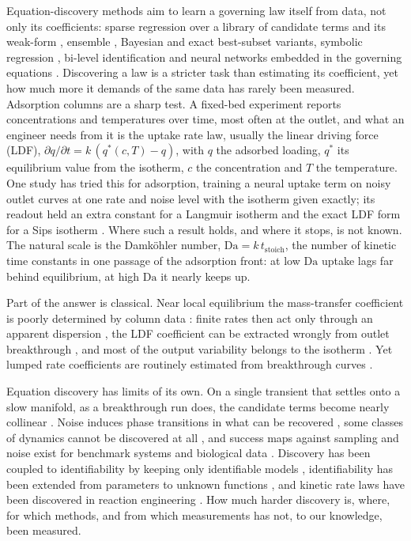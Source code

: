 \documentclass[11pt]{article}
\newcommand{\Da}{\mathrm{Da}}
\newcommand{\qs}{q^{*}}
\begin{document}
Equation-discovery methods aim to learn a governing law itself from data, not only its
coefficients: sparse regression over a library of candidate terms \citep{brunton2016,rudy2016}
and its weak-form \citep{messenger2021ode,reinbold2020}, ensemble \citep{fasel2022}, Bayesian \citep{fung2025} and exact best-subset
\citep{bertsimas2022} variants, symbolic regression
\citep{cranmer2023,udrescu2020,ruan2026,yu2026}, bi-level identification \citep{li2025bilevel} and
neural networks embedded in the governing equations \citep{santana2023}. Discovering a law is a
stricter task than estimating its coefficient, yet how much more it demands of the same data has
rarely been measured.
Adsorption columns are a sharp test. A fixed-bed experiment reports concentrations and temperatures
over time, most often at the outlet, and what an engineer needs from it is the uptake rate law,
usually the linear driving force (LDF), $\partial q/\partial t = k\,(\qs(c,T) - q)$, with $q$ the
adsorbed loading, $\qs$ its equilibrium value from the isotherm, $c$ the concentration and $T$ the
temperature. One study has tried this for adsorption, training a neural uptake term on noisy outlet curves at one
rate and noise level with the isotherm given exactly; its readout held an extra constant for a Langmuir
isotherm and the exact LDF form for a Sips isotherm \citep{santana2023}. Where such a result
holds, and where it stops, is not known. The natural scale is the Damk\"ohler number,
$\Da = k\,t_{\mathrm{stoich}}$, the number of kinetic time constants in one passage of the
adsorption front: at low $\Da$ uptake lags far behind equilibrium, at high $\Da$ it nearly keeps up.

Part of the answer is classical. Near local equilibrium the mass-transfer coefficient is
poorly determined by column data \citep{valocchi1985}: finite rates then act only through an
apparent dispersion \citep{katsoulas2023,dejaco2024}, the LDF coefficient can be extracted wrongly
from outlet breakthrough \citep{knox2016}, and most of the output variability belongs to the
isotherm \citep{ward2022,taylor2026}. Yet lumped rate coefficients are routinely estimated from
breakthrough curves \citep{miyabe2000,dejaco2025}. 

Equation discovery has limits of its own. On a single transient that settles onto a slow
manifold, as a breakthrough run does, the candidate terms become nearly collinear
\citep{stanhope2014,gallo2026,delgado2025}. Noise induces phase transitions in what can be
recovered \citep{klishin2024,fajardo2023}, some classes of dynamics cannot be discovered at all
\citep{shumaylov2025}, and success maps against sampling and noise exist for benchmark systems and biological data
\citep{egan2024,nardini2020}. Discovery has been coupled to identifiability by keeping
only identifiable models \citep{massonis2023}, identifiability has been extended from parameters
to unknown functions \citep{loman2026}, and kinetic rate laws have been discovered in reaction engineering \citep{hoffmann2019,servia2024}. How much harder discovery is, where, for which methods, and from which measurements
has not, to our knowledge, been measured.
\end{document}
